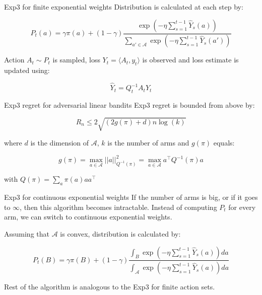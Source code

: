 \documentclass[aspectratio=169,xcolor=dvipsnames]{beamer}
\begin{document}
\begin{frame}{Exp3 for finite exponential weights}
    Distribution is calculated at each step by:

    \begin{equation}
        P_t(a) = \gamma \pi(a) + (1 - \gamma) \frac{\exp \left( - \eta \sum_{s=1}^{t-1} \hat{Y}_s(a) \right)}{\sum_{a' \in \mathbf{\mathcal{A}}} \exp \left( - \eta \sum_{s=1}^{t-1} \hat{Y}_s(a') \right)}
    \end{equation}

    Action $A_t \sim P_t$ is sampled, loss $Y_t = \langle A_t, y_t \rangle$ is observed and loss estimate is updated using:

    \begin{equation}
        \hat{Y}_t = Q_t^{-1} A_t Y_t
    \end{equation}

\end{frame}

\begin{frame}{Exp3 regret for adversarial linear bandits}
    Exp3 regret is bounded from above by:

    \begin{equation}
        R_n \leq 2 \sqrt{(2g(\pi) + d)n \log(k)}
    \end{equation}

    where $d$ is the dimension of $\mathbf{\mathcal{A}}$, $k$ is the number of arms and $g(\pi)$ equals:

    \begin{equation}
        g(\pi) = \max_{a \in \mathbf{\mathcal{A}}} ||a||^2_{Q^{-1}(\pi)} = \max_{a \in \mathbf{\mathcal{A}}} a^{\intercal}Q^{-1}(\pi)a
    \end{equation}

    with $Q(\pi) = \sum_a \pi(a)aa^{\intercal}$
\end{frame}

\begin{frame}{Exp3 for continuous exponential weights}
    If the number of arms is big, or if it goes to $\infty$, then this algorithm becomes intractable. Instead of computing $P_t$ for every arm, we can switch to continuous exponential weights.
    
    Assuming that $\mathbf{\mathcal{A}}$ is convex, distribution is calculated by:

    \begin{equation}
        P_t(B) = \gamma \pi(B) + (1-\gamma) \frac{\int_B \exp \left( - \eta \sum_{s=1}^{t-1} \hat{Y}_s(a) \right)da}{\int_\mathbf{\mathcal{A}} \exp \left( - \eta \sum_{s=1}^{t-1} \hat{Y}_s(a) \right)da}
    \end{equation}

    Rest of the algorithm is analogous to the Exp3 for finite action sets.
\end{frame}
\end{document}
